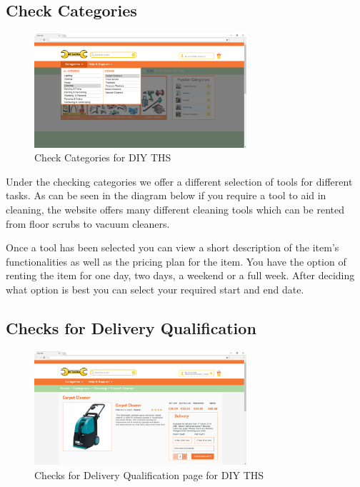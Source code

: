 \hypertarget{check-categories}{%
\subsection{Check Categories}\label{check-categories}}

\begin{figure}[H]
      \centering
      \includegraphics[trim = 0 0 0 0, clip, width=0.7\textwidth]{TempImg/cat.png}
      \caption{Check Categories for DIY THS}
 \end{figure}

Under the checking categories we offer a different selection of tools
for different tasks. As can be seen in the diagram below if you require
a tool to aid in cleaning, the website offers many different cleaning
tools which can be rented from floor scrubs to vacuum cleaners.

Once a tool has been selected you can view a short description of the
item's functionalities as well as the pricing plan for the item. You
have the option of renting the item for one day, two days, a weekend or
a full week. After deciding what option is best you can select your
required start and end date.

\newpage

\hypertarget{checks-for-delivery-qualification}{%
\subsection{Checks for Delivery
Qualification}\label{checks-for-delivery-qualification}}

\begin{figure}[H]
      \centering
      \includegraphics[trim = 0 0 0 0, clip, width=0.7\textwidth]{TempImg/deliv.png}
      \caption{Checks for Delivery Qualification page for DIY THS}
 \end{figure}

